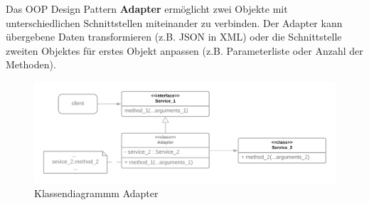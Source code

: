 Das OOP Design Pattern \textbf{Adapter} ermöglicht zwei Objekte mit unterschiedlichen Schnittstellen miteinander zu verbinden.
Der Adapter kann übergebene Daten transformieren (z.B. JSON in XML) 
oder die Schnittstelle zweiten Objektes für erstes Objekt anpassen
(z.B. Parameterliste oder Anzahl der Methoden).

\begin{figure}[H]
    \centering
    \includegraphics[width=1\textwidth]{Images/OOPAdapter.png}
    \caption[UML Adapter]{Klassendiagrammm Adapter}
    \label{fig:cd_adapter }
\end{figure}